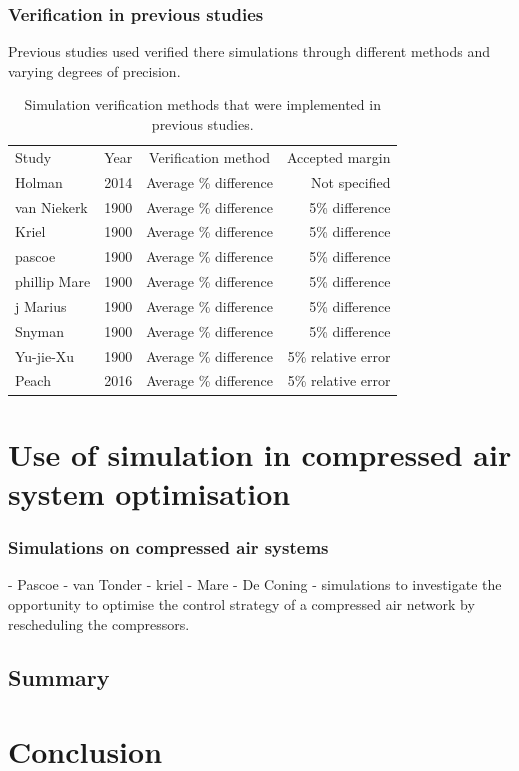  	\subsubsection{Verification in previous studies}
 	Previous studies used verified there simulations through different methods and varying degrees of precision. \\
 	\begin{table}[h]
 		\centering
 		\begin{tabular}{p{5cm}ccr}
 			\hline
 			Study & Year & Verification method & Accepted margin\\
 			\hhline{====}
 			Holman \cite{Holman2014Masters} & 2014 & Average \% difference & Not specified  \\
 			van Niekerk \cite{vanNiekerk2012Value} & 1900 & Average \% difference & 5\% difference \\
 			Kriel \cite{Marais2012PhD} &  1900 & Average \% difference & 5\% difference \\
 			pascoe \cite{Pascoe2016Masters} & 1900 & Average \% difference & 5\% difference \\	
 			phillip Mare \cite{Mare2016PhD} & 1900 & Average \% difference & 5\% difference  \\
 			j Marius \cite{Marais2012PhD} & 1900 & Average \% difference & 5\% difference\\	
 			Snyman	\cite{Snyman2011Masters} & 1900 & Average \% difference & 5\% difference\\	
 			Yu-jie-Xu \cite{xu2016modeling}& 1900 & Average \% difference & 5\% relative error\\	
 			Peach \cite{Peach2016Masters}& 2016 & Average \% difference & 5\% relative error\\
 			\hline
 		\end{tabular} 
 		\caption{Simulation verification methods that were implemented in previous studies.}
 		\label{table: Verification studies}
 	\end{table}
\clearpage	
\section{Use of simulation in compressed air system optimisation}
	

	\subsubsection{Simulations on compressed air systems}
		- Pascoe 
		- van Tonder
		- kriel
		- Mare
		- De Coning -  simulations to investigate the opportunity to optimise the control strategy of a compressed air network by rescheduling the compressors.
	\subsection{Summary}
	\label{Shortcomings of previous work}
		\clearpage	
\section{Conclusion}
